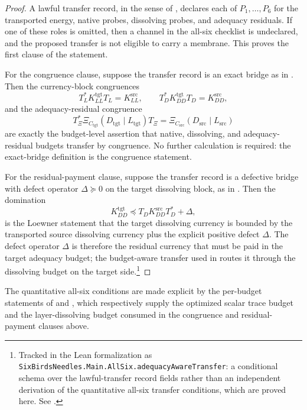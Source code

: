 \documentclass[11pt]{article}
\newcommand{\XiRes}{\Xi}
\newcommand{\preceqq}{\preceq}
\theoremstyle{definition}
\begin{document}
\begin{proof}
A lawful transfer record, in the sense of
, declares each of \(P_1,\ldots,P_6\)
for the transported energy, native probes, dissolving probes, and
adequacy residuals.  If one of these roles is omitted, then a channel
in the all-six checklist is undeclared, and the proposed transfer is
not eligible to carry a membrane.  This proves the first clause of the
statement.

For the congruence clause, suppose the transfer record is an exact
bridge as in .  Then the currency-block
congruences
\[
  T_L^*K^{\mathrm{tgt}}_{LL}T_L=K^{\mathrm{src}}_{LL},
  \qquad
  T_D^*K^{\mathrm{tgt}}_{DD}T_D=K^{\mathrm{src}}_{DD},
\]
and the adequacy-residual congruence
\[
  T_\Xi^*\XiRes_{C_{\mathrm{tgt}}}(D_{\mathrm{tgt}}\mid L_{\mathrm{tgt}})
  T_\Xi
  =
  \XiRes_{C_{\mathrm{src}}}(D_{\mathrm{src}}\mid L_{\mathrm{src}})
\]
are exactly the budget-level assertion that native, dissolving, and
adequacy-residual budgets transfer by congruence.  No further
calculation is required: the exact-bridge definition is the congruence
statement.

For the residual-payment clause, suppose the transfer record is a
defective bridge with defect operator \(\Delta\succeq0\) on the target
dissolving block, as in .  Then the
domination
\[
  K^{\mathrm{tgt}}_{DD}
    \preceqq T_DK^{\mathrm{src}}_{DD}T_D^*+\Delta,
\]
is the Loewner statement that the target dissolving currency is bounded
by the transported source dissolving currency plus the explicit
positive defect \(\Delta\).  The defect operator \(\Delta\) is therefore
the residual currency that must be paid in the target adequacy budget;
the budget-aware transfer used in  routes it
through the dissolving budget on the target side.\footnote{Tracked in the Lean formalization as
\texttt{SixBirdsNeedles.Main.AllSix.adequacyAwareTransfer}: a conditional
schema over the lawful-transfer record fields rather than an independent
derivation of the quantitative all-six transfer conditions, which are
proved here.  See .}
\end{proof}

The quantitative all-six conditions are made explicit by the per-budget
statements of  and ,
which respectively supply the optimized scalar trace budget and the
layer-dissolving budget consumed in the congruence and residual-payment
clauses above.
\end{document}
